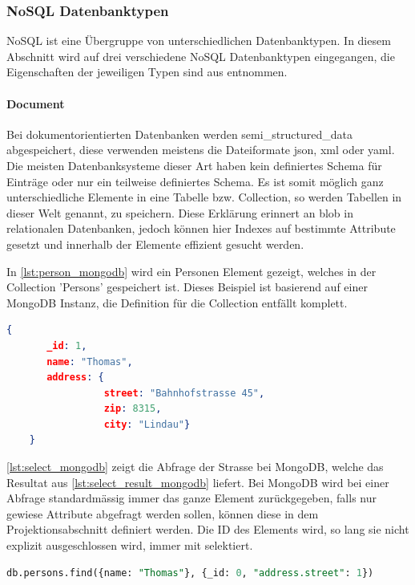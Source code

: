 \subsubsection{NoSQL Datenbanktypen}\label{no_sql_db_subgroups}
NoSQL ist eine Übergruppe von unterschiedlichen Datenbanktypen. In diesem Abschnitt wird auf drei verschiedene NoSQL Datenbanktypen eingegangen, die Eigenschaften der jeweiligen
 Typen sind aus \cite{vaish2013getting} entnommen.

\paragraph{Document}
Bei dokumentorientierten Datenbanken werden \gls{semi_structured_data} abgespeichert, diese verwenden meistens die Dateiformate \gls{json}, 
\gls{xml} oder \gls{yaml}. Die meisten Datenbanksysteme dieser Art haben kein definiertes Schema für Einträge oder 
nur ein teilweise definiertes Schema. Es ist somit möglich ganz unterschiedliche Elemente in eine Tabelle bzw. Collection, so werden Tabellen in dieser Welt genannt, zu speichern. Diese Erklärung 
erinnert an \gls{blob} in relationalen Datenbanken, jedoch können hier Indexes auf bestimmte Attribute gesetzt und innerhalb der Elemente effizient gesucht 
werden.

In \autoref{lst:person_mongodb} wird ein Personen Element gezeigt, welches in der Collection 'Persons' gespeichert ist. Dieses Beispiel ist basierend auf einer MongoDB Instanz, die Definition 
für die Collection entfällt komplett.

\begin{lstlisting}[language=JSON, caption=Personen Element in JSON Format, label=lst:person_mongodb]  
    {
       _id: 1,
       name: "Thomas",
       address: {
                 street: "Bahnhofstrasse 45",
                 zip: 8315,
                 city: "Lindau"}
    }
\end{lstlisting}

\autoref{lst:select_mongodb} zeigt die Abfrage der Strasse bei MongoDB, welche das Resultat aus \autoref{lst:select_result_mongodb} liefert. Bei MongoDB wird bei einer Abfrage standardmässig 
immer das ganze Element zurückgegeben, falls nur gewiese Attribute abgefragt werden sollen, können diese in dem Projektionsabschnitt definiert werden. Die ID des Elements wird, so lang 
sie nicht explizit ausgeschlossen wird, immer mit selektiert.

\begin{lstlisting}[language=SQL, caption=Abfrage in MongoDB, label=lst:select_mongodb]  
    db.persons.find({name: "Thomas"}, {_id: 0, "address.street": 1})
\end{lstlisting}

